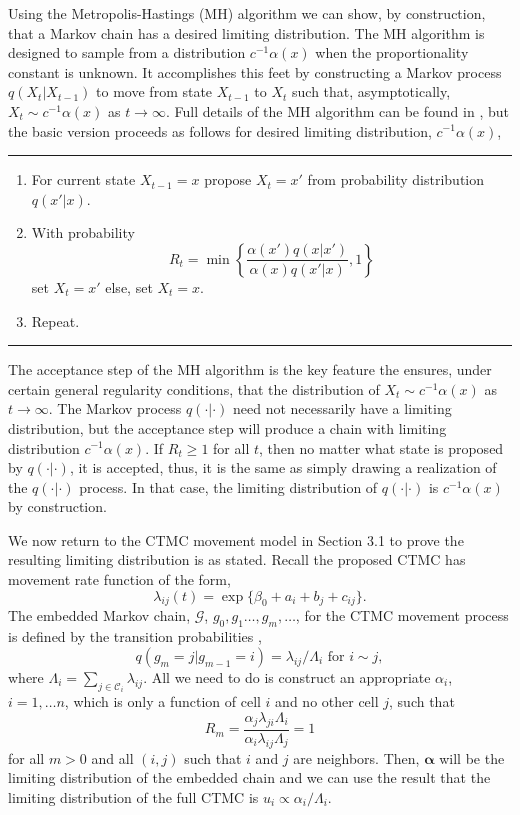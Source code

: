 \documentclass[12pt]{article}
\newcommand{\ba}{\ensuremath{\boldsymbol{\alpha}}}
\newcommand{\fG}{\ensuremath{\mathcal{G}}}
\newcommand{\fC}{\ensuremath{\mathcal{C}}}
\begin{document}
Using the Metropolis-Hastings (MH) algorithm we can show, by construction, that a Markov chain has a desired limiting distribution. The MH algorithm is designed to sample from a distribution $c^{-1}\alpha(x)$ when the proportionality constant is unknown. It accomplishes this feet by constructing a Markov process $q(X_t|X_{t-1})$ to move from state $X_{t-1}$ to $X_t$ such that, asymptotically, $X_t \sim c^{-1}\alpha(x)$ as $t\to \infty$. Full details of the MH algorithm can be found in \cite{chib1995understanding}, but the basic version proceeds as follows for desired limiting distribution, $c^{-1}\alpha(x)$, \bigskip
\hrule
\begin{enumerate}
\item For current state $X_{t-1} = x$ propose $X_t = x'$ from probability distribution $q(x'|x)$.
\item With probability 
\[
R_t = \min \left\{ \frac{\alpha(x')q(x|x')}{\alpha(x)q(x'|x)}, 1 \right\}
\]
set $X_t = x'$ else, set $X_t = x$. 
\item Repeat. 
\end{enumerate}
\hrule \bigskip
The acceptance step of the MH algorithm is the key feature the ensures, under certain general regularity conditions, that the distribution of $X_t \sim c^{-1}\alpha(x)$ as $t\to \infty$. The Markov process $q(\cdot|\cdot)$ need not necessarily have a limiting distribution, but the acceptance step will produce a chain with limiting distribution $c^{-1}\alpha(x)$. If $R_t \ge 1$ for all $t$, then no matter what state is proposed by $q(\cdot|\cdot)$, it is accepted, thus, it is the same as simply drawing a realization of the $q(\cdot|\cdot)$ process. In that case, the limiting distribution of $q(\cdot|\cdot)$ is $c^{-1}\alpha(x)$ by construction.

We now return to the CTMC movement model in Section 3.1 to prove the resulting limiting distribution is as stated. Recall the proposed CTMC has movement rate function of the form,
\[
\lambda_{ij}(t) = \exp\{\beta_0 + a_i + b_j + c_{ij}\}.
\]
The embedded Markov chain, $\fG$, $g_0,g_1\dots,g_m,\dots$, for the CTMC movement process is defined by the transition probabilities \citep{xxx},
\[
q(g_m=j|g_{m-1}=i) = \lambda_{ij}/ \Lambda_i \text{ for } i \sim j,
\]
where $\Lambda_i = \sum_{j\in\fC_i}\lambda_{ij}$. All we need to do is construct an appropriate $\alpha_i$, $i=1,\dots n$, which is only a function of cell $i$ and no other cell $j$, such that
\[
R_m = \frac{\alpha_j\lambda_{ji}\Lambda_i}{\alpha_i\lambda_{ij}\Lambda_j} = 1 
\]
for all $m>0$ and all $(i,j)$ such that $i$ and $j$ are neighbors. Then, $\ba$ will be the limiting distribution of the embedded chain and we can use the result that the limiting distribution of the full CTMC is $u_i \propto \alpha_i/\Lambda_i$.
\end{document}
